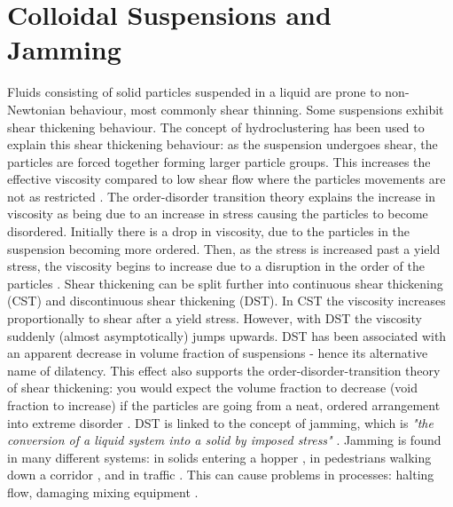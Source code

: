 \documentclass[twoside,a4]{report}
\def\br{\newline \newline \noindent}
\begin{document}
	\section*{Colloidal Suspensions and Jamming} %
	Fluids consisting of solid particles suspended in a liquid are prone to non-Newtonian behaviour, most commonly shear thinning. Some suspensions exhibit shear thickening behaviour. The concept of hydroclustering has been used to explain this shear thickening behaviour: as the suspension undergoes shear, the particles are forced together forming larger particle groups. This increases the effective viscosity compared to low shear flow where the particles movements are not as restricted \cite{figshearthick}. The order-disorder transition  theory explains the increase in viscosity as being due to an increase in stress causing the particles to become disordered. Initially there is a drop in viscosity, due to the particles in the suspension becoming more ordered. Then, as the stress is increased past a yield stress, the viscosity begins to increase due to a disruption in the order of the particles \cite{backbrownjaegrev}. %
	\br
	Shear thickening can be split further into continuous shear thickening (CST) and discontinuous shear thickening (DST). In CST the viscosity increases proportionally to shear after a yield stress. However, with DST the viscosity suddenly (almost asymptotically) jumps upwards. DST has been associated with an apparent decrease in volume fraction of suspensions - hence its alternative name of dilatency. This effect also supports the order-disorder-transition theory of shear thickening: you would expect the volume fraction to decrease (void fraction to increase) if the particles are going from a neat, ordered arrangement into extreme disorder \cite{backbrownjaegrev}. 
	\br
	DST is linked to the concept of jamming, which is \textit{"the conversion of a liquid system into a solid by imposed stress"} \cite{backhawjam}. Jamming is found in many different systems: in solids entering a hopper \cite{back2djam}, in pedestrians walking down a corridor \cite{backpedjam}, and in traffic \cite{backcarjam}. This can cause problems in processes: halting flow, damaging mixing equipment \cite{backshearjambertrand}. \br 
\end{document}
